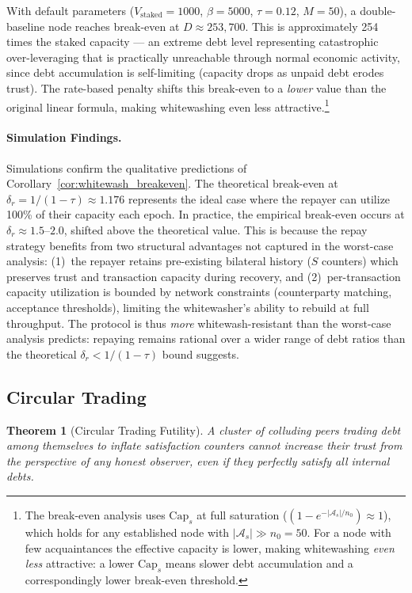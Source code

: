 \documentclass[11pt]{article}
\newtheorem{theorem}{Theorem}[section]
\begin{document}
With default parameters ($V_{\text{staked}} = 1000$, $\beta = 5000$, $\tau = 0.12$, $M = 50$), a double-baseline node reaches break-even at $D \approx 253{,}700$. This is approximately 254 times the staked capacity --- an extreme debt level representing catastrophic over-leveraging that is practically unreachable through normal economic activity, since debt accumulation is self-limiting (capacity drops as unpaid debt erodes trust). The rate-based penalty shifts this break-even to a \emph{lower} value than the original linear formula, making whitewashing even less attractive.\footnote{The break-even analysis uses $\text{Cap}_s$ at full saturation ($(1 - e^{-|\mathcal{A}_s|/n_0}) \approx 1$), which holds for any established node with $|\mathcal{A}_s| \gg n_0 = 50$. For a node with few acquaintances the effective capacity is lower, making whitewashing \emph{even less} attractive: a lower $\text{Cap}_s$ means slower debt accumulation and a correspondingly lower break-even threshold.}

\paragraph{Simulation Findings.} Simulations confirm the qualitative predictions of Corollary~\ref{cor:whitewash_breakeven}. The theoretical break-even at $\delta_r = 1/(1-\tau) \approx 1.176$ represents the ideal case where the repayer can utilize 100\% of their capacity each epoch. In practice, the empirical break-even occurs at $\delta_r \approx 1.5$--$2.0$, shifted above the theoretical value. This is because the repay strategy benefits from two structural advantages not captured in the worst-case analysis: (1)~the repayer retains pre-existing bilateral history ($S$ counters) which preserves trust and transaction capacity during recovery, and (2)~per-transaction capacity utilization is bounded by network constraints (counterparty matching, acceptance thresholds), limiting the whitewasher's ability to rebuild at full throughput. The protocol is thus \emph{more} whitewash-resistant than the worst-case analysis predicts: repaying remains rational over a wider range of debt ratios than the theoretical $\delta_r < 1/(1-\tau)$ bound suggests.

\subsection{Circular Trading}

\begin{theorem}[Circular Trading Futility]\label{thm:circular}
A cluster of colluding peers trading debt among themselves to inflate satisfaction counters cannot increase their trust from the perspective of any honest observer, even if they perfectly satisfy all internal debts.
\end{theorem}
\end{document}
